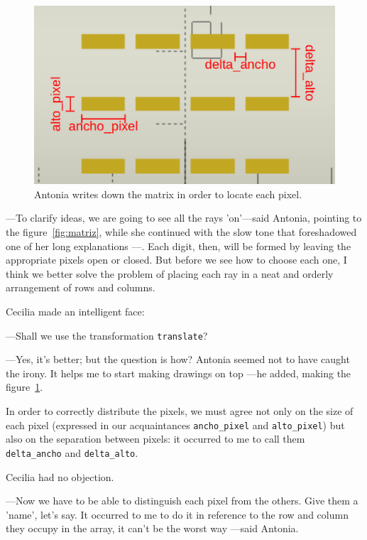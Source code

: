 \begin{figure}[ht]
  \centering
  \includegraphics[width=.55\textwidth]{imagenes/matriz-anotada-2}
  \caption{Antonia writes down the matrix in order to locate each pixel.}
  \label{fig:matriz-anotada-2}
\end{figure}
  

---To clarify ideas, we are going to see all the rays 'on'---said Antonia, pointing to the figure~\ref{fig:matriz}, while she continued with the slow tone that foreshadowed one of her long explanations
---. Each digit, then, will be formed by leaving the appropriate pixels open or closed. But before we see how to choose each one, I think we better solve the problem of placing each ray in a neat and orderly arrangement of rows and columns.

Cecilia made an intelligent face: 

---Shall we use the transformation \lstinline!translate!? 

---Yes, it's  better; but the question is how? Antonia seemed not to have caught the irony. It helps me to start making drawings on top ---he added, making the figure~\ref{fig:matriz-anotada-2}.

\guillemotright In order to correctly distribute the pixels, we must agree not only on the size of each pixel (expressed in our acquaintances \texttt{ancho\_pixel} and \texttt{alto\_pixel}) but also on the separation between pixels: it occurred to me to call them  \texttt{delta\_ancho} and \texttt{delta\_alto}.

Cecilia had no objection.

---Now we have to be able to distinguish each pixel from the others. Give them a 'name', let's say. It occurred to me to do it in reference to the row and column they occupy in the array, it can't be the worst
way ---said Antonia.

